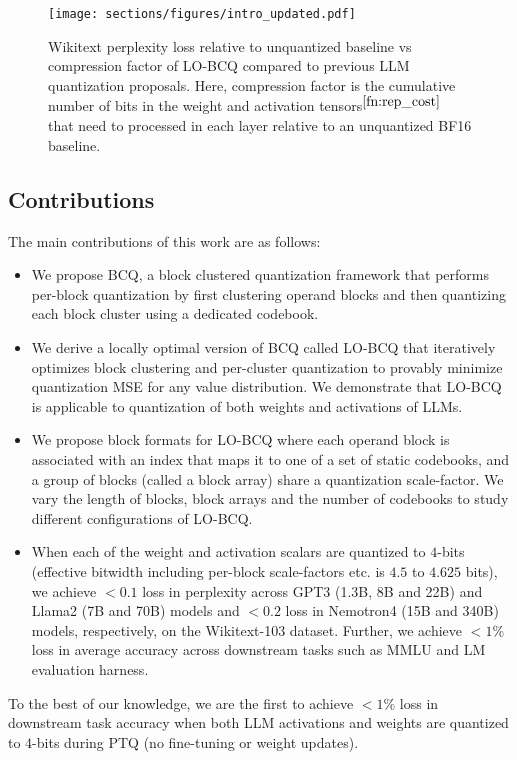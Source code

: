 \begin{figure}
\centering
\texttt{[image: sections/figures/intro\_updated.pdf]}
\caption{\small Wikitext perplexity loss relative to unquantized baseline vs compression factor of LO-BCQ compared to previous LLM quantization proposals. Here, compression factor is the cumulative number of bits in the weight and activation tensors$^{\ref{fn:rep_cost}}$ that need to processed in each layer relative to an unquantized BF16 baseline.}
\label{fig:motivation}
\end{figure}

\subsection{Contributions}
\vspace{-0.3em}
The main contributions of this work are as follows:
\begin{itemize}
\item We propose BCQ, a block clustered quantization framework that performs per-block quantization by first clustering operand blocks and then quantizing each block cluster using a dedicated codebook.
\item We derive a locally optimal version of BCQ called LO-BCQ that iteratively optimizes block clustering and per-cluster quantization to provably minimize quantization MSE for any value distribution. We demonstrate that LO-BCQ is applicable to quantization of both weights and activations of LLMs.
\item We propose block formats for LO-BCQ where each operand block is associated with an index that maps it to one of a set of static codebooks, and a group of blocks (called a block array) share a quantization scale-factor. We vary the length of blocks, block arrays and the number of codebooks to study different configurations of LO-BCQ. 
\item When each of the weight and activation scalars are quantized to $4$-bits (effective bitwidth including per-block scale-factors etc. is $4.5$ to $4.625$ bits), we achieve $<0.1$ loss in perplexity across GPT3 (1.3B, 8B and 22B) and Llama2 (7B and 70B) models and $<0.2$ loss in Nemotron4 (15B and 340B) models, respectively, on the Wikitext-103 dataset. Further, we achieve $<1$\% loss in average accuracy across downstream tasks such as MMLU and LM evaluation harness. 
\end{itemize}
To the best of our knowledge, we are the first to achieve $<1$\% loss in downstream task accuracy when both LLM activations and weights are quantized to $4$-bits during PTQ (no fine-tuning or weight updates).



